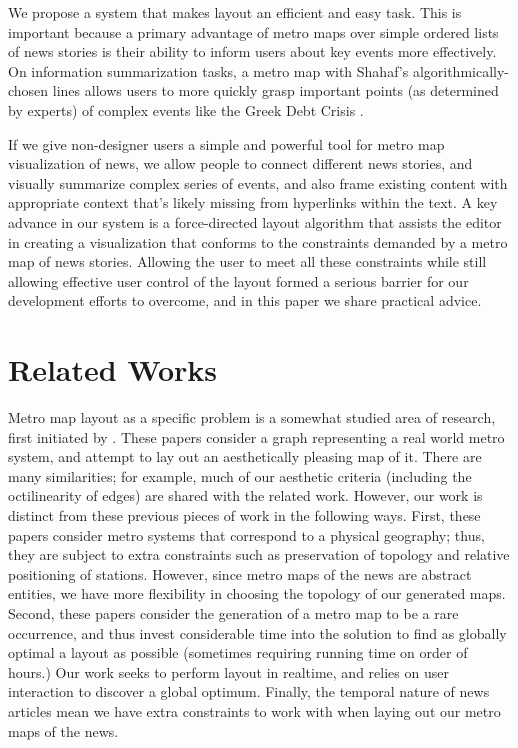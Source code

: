 \documentclass{chi2009}
\begin{document}
We propose a system that makes layout an efficient and easy task. This is important because a primary advantage of metro maps over simple ordered lists of news stories is their ability to inform users about key events more effectively. On information summarization tasks, a metro map with Shahaf's algorithmically-chosen lines  allows users to more quickly grasp important points (as determined by experts) of complex events like the Greek Debt Crisis \cite{}.

If we give non-designer users a simple and powerful tool for metro map visualization of news, we allow people to connect different news stories, and visually summarize complex series of events, and also frame existing content with appropriate context that's likely missing from hyperlinks within the text.
A key advance in our system is a force-directed layout algorithm that assists the editor in creating a visualization that conforms to the constraints demanded by a metro map of news stories. Allowing the user to meet all these constraints while still allowing effective user control of the layout formed a serious barrier for our development efforts to overcome, and in this paper we share practical advice.

\section{Related Works}

Metro map layout as a specific problem is a somewhat studied area of research, first initiated by \cite{hong2005}. These papers consider a graph representing a real world metro system, and attempt to lay out an aesthetically pleasing map of it. \cite{nollenburg2006,stott2011} There are many similarities; for example, much of our aesthetic criteria (including the octilinearity of edges) are shared with the related work. However, our work is distinct from these previous pieces of work in the following ways. First, these papers consider metro systems that correspond to a physical geography; thus, they are subject to extra constraints such as preservation of topology and relative positioning of stations. However, since metro maps of the news are abstract entities, we have more flexibility in choosing the topology of our generated maps. Second, these papers consider the generation of a metro map to be a rare occurrence, and thus invest considerable time into the solution to find as globally optimal a layout as possible (sometimes requiring running time on order of hours.) Our work seeks to perform layout in realtime, and relies on user interaction to discover a global optimum. Finally, the temporal nature of news articles mean we have extra constraints to work with when laying out our metro maps of the news.
\end{document}
